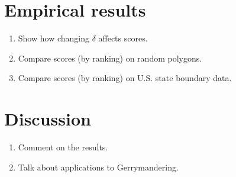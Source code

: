 \documentclass[draft]{jocg}
\theoremstyle{definition}
\theoremstyle{remark}
\begin{document}
\section{Empirical results}

\begin{enumerate}
  \item Show how changing $\delta$ affects scores.
  \item Compare scores (by ranking) on random polygons.
  \item Compare scores (by ranking) on U.S. state boundary data.
\end{enumerate}

\section{Discussion}

\begin{enumerate}
  \item Comment on the results.\cite{cgal:eb-18a}
  \item Talk about applications to Gerrymandering.\cite{cgal:gw-p2-18a}
\end{enumerate}

\medskip

\printbibliography[heading=bibintoc]
\end{document}
